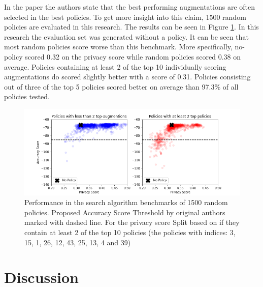 In the paper the authors state that the best performing augmentations are often selected in the best policies. To get more insight into this claim, 1500 random policies are evaluated in this research. The results can be seen in Figure \ref{fig:bunch_a_policies}. In this research the evaluation set was generated without a policy. It can be seen that most random policies score worse than this benchmark. More specifically, no-policy scored 0.32 on the privacy score while random policies scored 0.38 on average. Policies containing at least 2 of the top 10 individually scoring augmentations do scored slightly better with a score of 0.31. Policies consisting out of three of the top 5 policies scored better on average than 97.3\% of all policies tested.

\begin{figure}[htp]
    \centering
    \includegraphics[width=12cm]{pics/policy_comparison.png}
    \caption{Performance in the search algorithm benchmarks of 1500 random policies. Proposed Accuracy Score Threshold by original authors marked with dashed line. For the privacy score  Split based on if they contain at least 2 of the top 10 policies (the policies with indices: 3, 15, 1, 26, 12, 43, 25, 13, 4 and 39)}
    \label{fig:bunch_a_policies}
\end{figure}

\newpage
\section{Discussion}\label{sec:discuss}


